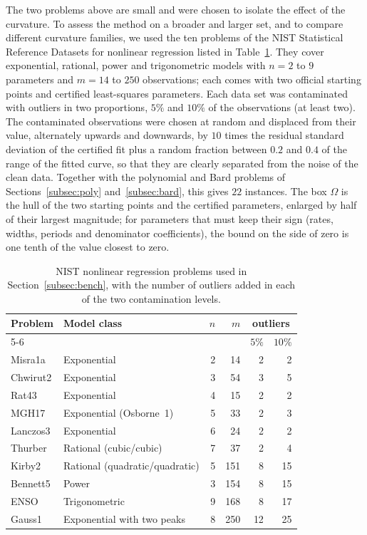 \documentclass[11pt]{article}
\begin{document}
The two problems above are small and were chosen to isolate the effect of the
curvature. To assess the method on a broader and larger set, and to compare
different curvature families, we used the ten problems of the NIST Statistical
Reference Datasets for nonlinear regression \cite{nist} listed in
Table~\ref{tab:nist}. They cover exponential, rational, power and
trigonometric models
with $n = 2$ to $9$ parameters and $m = 14$ to $250$ observations; each comes
with two official starting points and certified least-squares parameters. Each
data set was contaminated with outliers in two proportions, $5\%$ and $10\%$
of the observations (at least two). The contaminated observations were chosen
at random and displaced from their value, alternately upwards and downwards, by
$10$ times the residual standard deviation of the certified fit plus a random
fraction between $0.2$ and $0.4$ of the range of the fitted curve, so that
they are clearly separated from the noise of the clean data. Together with the
polynomial and Bard problems of Sections~\ref{subsec:poly}
and~\ref{subsec:bard}, this gives $22$ instances. The box $\Omega$ is the hull
of the two starting points and the certified parameters, enlarged by half of
their largest magnitude; for parameters that must keep their sign (rates,
widths, periods and denominator coefficients), the bound on the side of zero
is one tenth of the value closest to zero.

\begin{table}[ht!]
\centering
\small
\begin{tabular}{llrrrr}
\hline
Problem & Model class & $n$ & $m$ & \multicolumn{2}{c}{outliers} \\
\cline{5-6}
 & & & & $5\%$ & $10\%$ \\
\hline
Misra1a  & Exponential                  & 2 &  14 &  2 &  2 \\
Chwirut2 & Exponential                  & 3 &  54 &  3 &  5 \\
Rat43    & Exponential                  & 4 &  15 &  2 &  2 \\
MGH17    & Exponential (Osborne~1)      & 5 &  33 &  2 &  3 \\
Lanczos3 & Exponential                  & 6 &  24 &  2 &  2 \\
Thurber  & Rational (cubic/cubic)       & 7 &  37 &  2 &  4 \\
Kirby2   & Rational (quadratic/quadratic) & 5 & 151 &  8 & 15 \\
Bennett5 & Power                        & 3 & 154 &  8 & 15 \\
ENSO     & Trigonometric                & 9 & 168 &  8 & 17 \\
Gauss1   & Exponential with two peaks   & 8 & 250 & 12 & 25 \\
\hline
\end{tabular}
\caption{NIST nonlinear regression problems used in Section~\ref{subsec:bench},
with the number of outliers added in each of the two contamination levels.}
\label{tab:nist}
\end{table}
\end{document}
